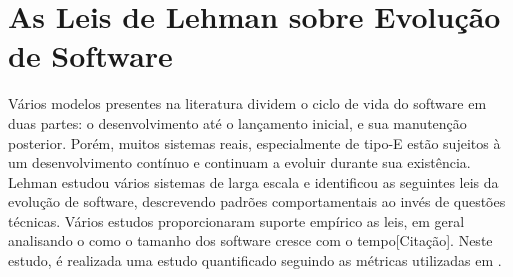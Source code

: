 \section{As Leis de Lehman sobre Evolução de Software}

Vários modelos presentes na literatura dividem o ciclo de vida do software em duas partes: o desenvolvimento até o lançamento inicial, e sua manutenção posterior. Porém, muitos sistemas reais, especialmente de tipo-E estão sujeitos à um desenvolvimento contínuo e continuam a evoluir durante sua existência. 
Lehman estudou vários sistemas de larga escala e identificou as seguintes leis da evolução de software, descrevendo padrões comportamentais ao invés de questões técnicas\cite{lehman1979understanding,lehman1996laws}. Vários estudos proporcionaram suporte empírico as leis, em geral analisando o como o tamanho dos software cresce com o tempo[Citação]. Neste estudo, é realizada uma estudo quantificado seguindo as métricas utilizadas em \cite{israeli2010linux}.

